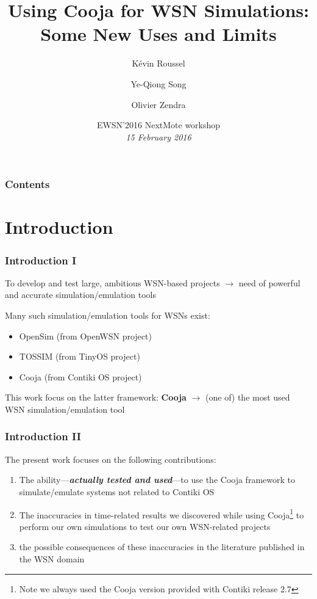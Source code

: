\documentclass[10pt,c]{beamer}
\title{Using Cooja for WSN Simulations: Some New Uses and Limits}
\author{Kévin Roussel \and Ye-Qiong Song \and Olivier Zendra}
\institute{INRIA Nancy Grand-Est~---
           LORIA UMR~7503~--- Université de Lorraine}
\date{EWSN'2016 NextMote workshop\\
      \textit{15 February 2016}}
\renewcommand{\emph}[1]{\textbf{\textit{#1}}}
\newcommand{\nom}[1]{\textbf{#1}}
\begin{document}
\begin{frame}
\titlepage
\end{frame}


\begin{frame}
\frametitle{Contents}
\tableofcontents
\end{frame}


\section{Introduction}

\begin{frame}
\frametitle{Introduction I}
\begin{block}{To develop and test large, ambitious WSN-based projects}
$\rightarrow$ need of powerful and accurate simulation/emulation tools
\end{block}
\begin{block}{Many such simulation/emulation tools for WSNs exist:}
\begin{itemize}
\item OpenSim (from OpenWSN project)
\item TOSSIM (from TinyOS project)
\item Cooja (from Contiki OS project)
\end{itemize}
\end{block}
\begin{exampleblock}{This work focus on the latter framework: \nom{Cooja}}
$\rightarrow$ (one of) the most used WSN simulation/emulation tool
\end{exampleblock}
\end{frame}

\begin{frame}
\frametitle{Introduction II}
\begin{block}{The present work focuses on the following contributions:}
\begin{enumerate}
\item The ability---\emph{actually tested and used}---to use the Cooja
framework to simulate/emulate systems not related to Contiki OS
\item The inaccuracies in time-related results we discovered while using
Cooja\footnote{Note we always used the Cooja version provided with
Contiki release 2.7} to perform our own simulations to test our own
WSN-related projects
\item the possible consequences of these inaccuracies in the literature
published in the WSN domain
\end{enumerate}
\end{block}
\end{frame}
\end{document}
